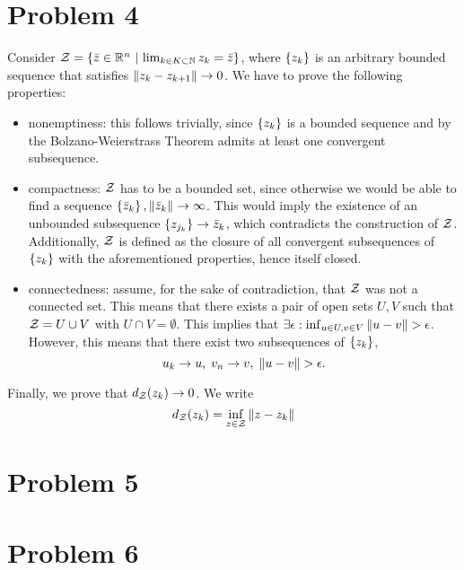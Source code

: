 \documentclass[10pt]{article}
\begin{document}
\section*{Problem 4}
Consider $\mathcal{Z} = \left\{ \bar{z} \in \mathbb{R}^n \ \middle| \  \lim_{k \in K \subset \mathbb{N}} z_{k}
= \bar{z} \right\}$, where $\left\{ z_k \right\}$ is an arbitrary bounded sequence that satisfies
$\left \| z_k - z_{k+1} \right \| \to 0$. We have to prove the following properties:
\begin{itemize}
\item nonemptiness: this follows trivially, since $\left\{ z_k \right\}$ is a bounded
sequence and by the Bolzano-Weierstrass Theorem admits at least one convergent
subsequence.
\item compactness: $\mathcal{Z}$ has to be a bounded set, since otherwise we would be
able to find a sequence $\left\{ \bar{z}_k \right\}, \left \| \bar{z}_k \right \| \to \infty$. This
would imply the existence of an unbounded subsequence $\left\{ z_{j_k} \right\} \to
\bar{z}_k$, which contradicts the construction of $\mathcal{Z}$.
Additionally, $\mathcal{Z}$ is defined as the closure of all convergent subsequences of
$\left\{ z_k \right\}$ with the aforementioned properties, hence itself closed.
\item connectedness: assume, for the sake of contradiction, that $\mathcal{Z}$ was not
a connected set. This means that there exists a pair of open sets $U, V$ such
that $\mathcal{Z} = U \cup V$ with $U \cap V = \emptyset$. This implies that
$\exists \epsilon: \inf_{u \in U, v \in V} \left \| u - v \right \| > \epsilon$. However,
this means that there exist two subsequences of $\left\{ z_k \right\}$,
\[
    u_{k} \to u, \; v_{n} \to v, \; \left \| u - v \right \| > \epsilon.
\]

\end{itemize}
Finally, we prove that $d_{\mathcal{Z}}(z_k) \to 0$. We write
\[
    d_{\mathcal{Z}}(z_k) = \inf_{z \in \mathcal{Z}} \left \| z - z_k \right \|
\]

\section*{Problem 5}

\section*{Problem 6}
\end{document}
